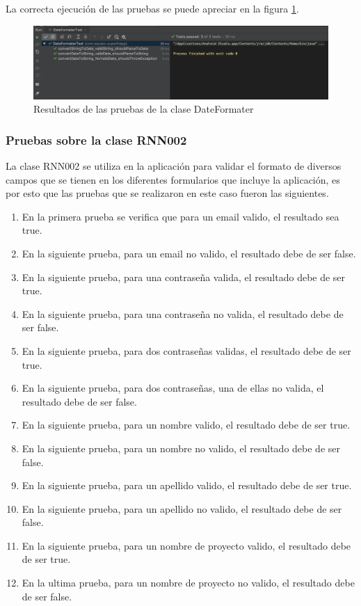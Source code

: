 La correcta ejecución de las pruebas se puede apreciar en la figura \ref{fig:dateTest}.

\begin{figure}[h]
	\centering
	\includegraphics[width=450px]{capitulo6/unitarias/img/dateTest.png}
	\caption{Resultados de las pruebas de la clase DateFormater}
	\label{fig:dateTest}
\end{figure}

\subsubsection{Pruebas sobre la clase RNN002}
La clase RNN002 se utiliza en la aplicación para validar el formato de diversos campos que se tienen en los diferentes formularios que incluye la aplicación, es por esto que las pruebas que se realizaron en este caso fueron las siguientes.

\begin{enumerate}
	\item En la primera prueba se verifica que para un email valido, el resultado sea true.
	\item En la siguiente prueba, para un email no valido, el resultado debe de ser false.
	\item En la siguiente prueba, para una contraseña valida, el resultado debe de ser true.
	\item En la siguiente prueba, para una contraseña no valida, el resultado debe de ser false.
	\item En la siguiente prueba, para dos contraseñas validas, el resultado debe de ser true.
	\item En la siguiente prueba, para dos contraseñas, una de ellas no valida, el resultado debe de ser false.
	\item En la siguiente prueba, para un nombre valido, el resultado debe de ser true.
	\item En la siguiente prueba, para un nombre no valido, el resultado debe de ser false.
	\item En la siguiente prueba, para un apellido valido, el resultado debe de ser true.
	\item En la siguiente prueba, para un apellido no valido, el resultado debe de ser false.
	\item En la siguiente prueba, para un nombre de proyecto valido, el resultado debe de ser true.
	\item En la ultima prueba, para un nombre de proyecto no valido, el resultado debe de ser false.
\end{enumerate}

